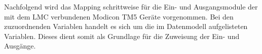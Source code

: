 \documentclass[../../../Bachelorarbeit.tex]{subfiles}
\begin{document}

Nachfolgend wird das Mapping schrittweise für die Ein- und Ausgangsmodule der mit dem LMC verbundenen Modicon TM5 Geräte vorgenommen. Bei den zuzuordnenden Variablen handelt es sich um die im Datenmodell aufgelisteten Variablen. Dieses dient somit als Grundlage für die Zuweisung der Ein- und Ausgänge.
\end{document}
